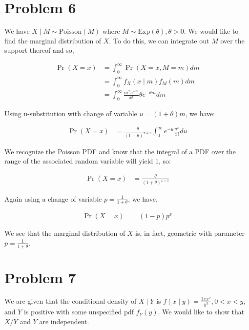 \documentclass[11pt]{article}
\begin{document}
\section*{Problem 6}

We have $X \mid M \sim \mathrm{Poisson}(M)$ where $M \sim
\mathrm{Exp}(\theta), \theta > 0$.  We would like to find the marginal
distribution of $X$.  To do this, we can integrate out $M$ over the
support thereof and so,

\begin{align*}
  \Pr{(X = x)} &= \int_0^{\infty} \Pr{(X=x,M=m)} dm \\
  &= \int_0^{\infty} f_X(x \mid m) f_M(m) dm \\
  &= \int_0^{\infty} \frac{m^x e^{-m}}{x!}
    \theta e^{-\theta m} dm
\end{align*}

Using u-substitution with change of variable $u = (1+\theta)m$, we
have:

\begin{align*}
  \Pr{(X=x)} &= \frac{\theta}{(1+\theta)^{x+1}} \int_0^{\infty} e^{-u}
               \frac{u^x}{x!} du
\end{align*}

We recognize the Poisson PDF and know that the integral of a PDF over
the range of the associated random variable will yield 1, so:

\begin{align*}
  \Pr{(X=x)} &= \frac{\theta}{(1+\theta)^{x+1}}
\end{align*}

Again using a change of variable $p = \frac{1}{1+\theta}$, we have,

\begin{align*}
  \Pr{(X=x)} &= (1-p)p^x
\end{align*}

We see that the marginal distribution of $X$ is, in fact, geometric with parameter $p =
\frac{1}{1+\theta}$.

\section*{Problem 7}

We are given that the conditional density of $X \mid Y$ is $f(x \mid
y) = \frac{3xx^2}{y^3}, 0<x<y$, and $Y$ is positive with some
unspecified pdf $f_Y(y)$.  We would like to show that $X/Y$ and $Y$
are independent.
\end{document}
